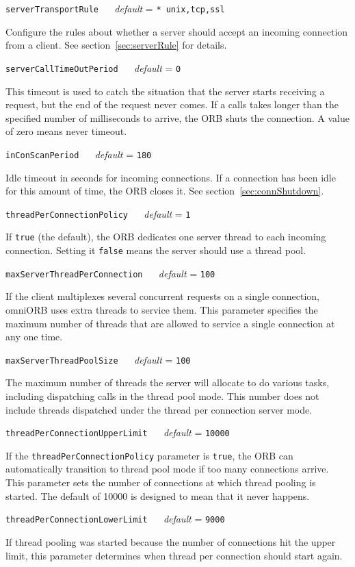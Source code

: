 \documentclass[11pt,oneside,a4paper]{book}
\makeatletter
\newcommand{\code}[1]{\texttt{#1}}
\newcommand{\confopt}[2]
  {\vspace{\baselineskip}\par\noindent\code{#1} ~~ \textit{default} =
   \code{#2}}
\renewcommand{\confopt}[2]
  {\vspace{\baselineskip}\par\noindent\code{#1} ~~ \textit{default} =
   \code{#2}\\[-1ex]\@afterheading}
\makeatother
\begin{document}
\confopt{serverTransportRule}{* unix,tcp,ssl}

Configure the rules about whether a server should accept an incoming
connection from a client. See section~\ref{sec:serverRule} for
details.


\confopt{serverCallTimeOutPeriod}{0}

This timeout is used to catch the situation that the server starts
receiving a request, but the end of the request never comes. If a
calls takes longer than the specified number of milliseconds to
arrive, the ORB shuts the connection. A value of zero means never
timeout.


\confopt{inConScanPeriod}{180}

Idle timeout in seconds for incoming connections. If a connection has
been idle for this amount of time, the ORB closes it. See
section~\ref{sec:connShutdown}.


\confopt{threadPerConnectionPolicy}{1}

If \code{true} (the default), the ORB dedicates one server thread to
each incoming connection. Setting it \code{false} means the server
should use a thread pool.


\confopt{maxServerThreadPerConnection}{100}

If the client multiplexes several concurrent requests on a single
connection, omniORB uses extra threads to service them. This parameter
specifies the maximum number of threads that are allowed to service a
single connection at any one time.


\confopt{maxServerThreadPoolSize}{100}

The maximum number of threads the server will allocate to do various
tasks, including dispatching calls in the thread pool mode. This
number does not include threads dispatched under the thread per
connection server mode.


\confopt{threadPerConnectionUpperLimit}{10000}

If the \code{threadPerConnectionPolicy} parameter is \code{true}, the
ORB can automatically transition to thread pool mode if too many
connections arrive. This parameter sets the number of connections at
which thread pooling is started. The default of 10000 is designed to
mean that it never happens.


\confopt{threadPerConnectionLowerLimit}{9000}

If thread pooling was started because the number of connections hit
the upper limit, this parameter determines when thread per connection
should start again.
\end{document}
